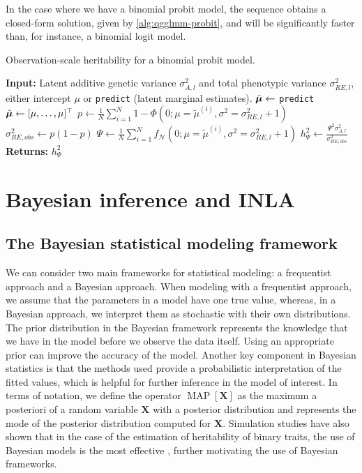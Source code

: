 In the case where we have a binomial probit model, the sequence obtains a closed-form solution, given by \autoref{alg:qgglmm-probit}, and will be significantly faster than, for instance, a binomial logit model.

\begin{algorithm}
\caption{Observation-scale heritability for a binomial probit model.} \label{alg:qgglmm-probit}
    \begin{algorithmic}
    \State \textbf{Input:} Latent additive genetic variance $\sigma^2_{A,l}$ and total phenotypic variance $\sigma^2_{RE,l}$, either intercept $\mu$ or \texttt{predict} (latent marginal estimates).
        \State $\Tilde{\bm\mu} \gets$ \texttt{predict}
    \Else
        \State $\Tilde{\bm\mu} \gets [\mu, \dots, \mu]^\top$ 
    \EndIf
    \State $p \gets \frac{1}{N} \sum_{i=1}^N 1-\Phi(0;\mu=\tilde\mu^{(i)},\sigma^2=\sigma^2_{RE,l}+1)$
    \State $\sigma^2_{RE,obs} \gets p(1-p)$
    \State $\Psi \gets \frac{1}{N}\sum_{i=1}^N f_{\mathcal N}(0;\mu=\tilde\mu^{(i)},\sigma^2=\sigma^2_{RE,l}+1)$
    \State $h^2_{\Psi} \gets \frac{\Psi^2 \sigma^2_{A,l}}{\sigma^2_{RE,obs}}$
    \State \textbf{Returns: } $h^2_{\Psi}$
    \end{algorithmic}
\end{algorithm}

\section{Bayesian inference and INLA}

\subsection{The Bayesian statistical modeling framework}

We can consider two main frameworks for statistical modeling: a frequentist approach and a Bayesian approach. When modeling with a frequentist approach, we assume that the parameters in a model have one true value, whereas, in a Bayesian approach, we interpret them as stochastic with their own distributions. The prior distribution in the Bayesian framework represents the knowledge that we have in the model before we observe the data itself. Using an appropriate prior can improve the accuracy of the model. Another key component in Bayesian statistics is that the methods used provide a probabilistic interpretation of the fitted values, which is helpful for further inference in the model of interest. In terms of notation, we define the operator $\operatorname{MAP}[\bm X]$ as the maximum a posteriori of a random variable $\bm X$ with a posterior distribution and represents the mode of the posterior distribution computed for $\bm X$.
Simulation studies have also shown that in the case of the estimation of heritability of binary traits, the use of Bayesian models is the most effective \autocite{devillemereuil2013}, further motivating the use of Bayesian frameworks.

